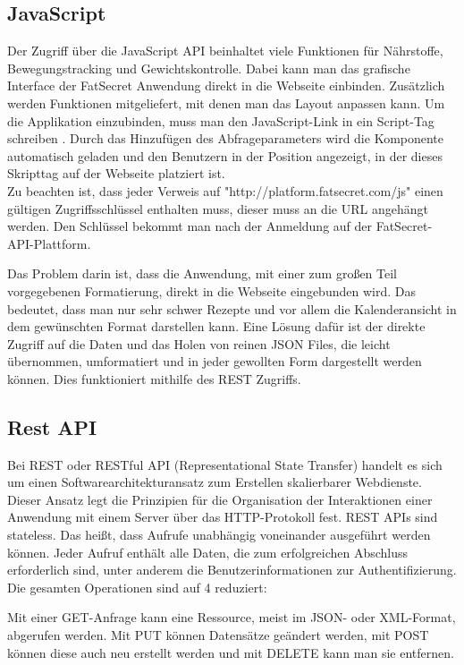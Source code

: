 \subsection{JavaScript}
Der Zugriff über die JavaScript API beinhaltet viele Funktionen für Nährstoffe, Bewegungstracking und Gewichtskontrolle. Dabei kann man das grafische Interface der FatSecret Anwendung direkt in die Webseite einbinden. Zusätzlich werden Funktionen mitgeliefert, mit denen man das Layout anpassen kann. Um die Applikation einzubinden, muss man den JavaScript-Link in ein Script-Tag schreiben . Durch das Hinzufügen des Abfrageparameters  wird die Komponente automatisch geladen und den Benutzern in der Position angezeigt, in der dieses Skripttag auf der Webseite platziert ist. \\ Zu beachten ist, dass jeder Verweis auf "http://platform.fatsecret.com/js" einen gültigen Zugriffsschlüssel enthalten muss, dieser muss an die URL angehängt werden. Den Schlüssel bekommt man nach der Anmeldung auf der FatSecret-API-Plattform.  

Das Problem darin ist, dass die Anwendung, mit einer zum großen Teil vorgegebenen Formatierung, direkt in die Webseite eingebunden wird. Das bedeutet, dass man nur sehr schwer Rezepte und vor allem die Kalenderansicht in dem gewünschten Format darstellen kann. Eine Lösung dafür ist der direkte Zugriff auf die Daten und das Holen von reinen JSON Files, die leicht übernommen, umformatiert und in jeder gewollten Form dargestellt werden können. Dies funktioniert mithilfe des REST Zugriffs.
\subsection{Rest API}
Bei REST oder RESTful API (Representational State Transfer)  \cite{restapidef}  handelt es sich um einen Softwarearchitekturansatz zum Erstellen skalierbarer Webdienste. Dieser Ansatz legt die Prinzipien für die Organisation der Interaktionen einer Anwendung mit einem Server über das HTTP-Protokoll fest. REST APIs sind stateless. Das heißt, dass Aufrufe unabhängig voneinander ausgeführt werden können. Jeder Aufruf enthält alle Daten, die zum erfolgreichen Abschluss erforderlich sind, unter anderem die Benutzerinformationen zur Authentifizierung. 
Die gesamten Operationen sind auf 4 reduziert: 

Mit einer GET-Anfrage kann eine Ressource, meist im JSON- oder XML-Format, abgerufen werden. Mit PUT können Datensätze geändert werden, mit POST können diese auch neu erstellt werden und mit DELETE kann man sie entfernen. 

